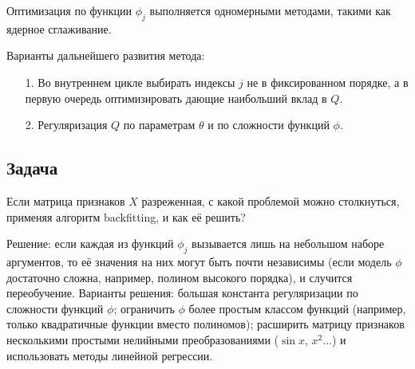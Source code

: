 Оптимизация по функции $\phi_j$ выполняется одномерными методами, такими как ядерное сглаживание.

Варианты дальнейшего развития метода:
\begin{itemize}
    \item [1.] Во внутреннем цикле выбирать индексы $j$ не в фиксированном порядке, а в первую очередь оптимизировать дающие наибольший вклад в $Q$.
    \item [2.] Регуляризация $Q$ по параметрам $\theta$ и по сложности функций $\phi$.
\end{itemize}

\subsection{Задача}

Если матрица признаков $X$ разреженная, с какой проблемой можно столкнуться, применяя алгоритм backfitting, и как её решить?

Решение: если каждая из функций $\phi_j$ вызывается лишь на небольшом наборе аргументов, то её значения на них могут быть почти независимы (если модель $\phi$ достаточно сложна, например, полином высокого порядка), и случится переобучение. Варианты решения: большая константа регуляризации по сложности функций $\phi$; ограничить $\phi$ более простым классом функций (например, только квадратичные функции вместо полиномов); расширить матрицу признаков несколькими простыми нелийными преобразованиями ($\sin x$, $x^2$...) и использовать методы линейной регрессии.
